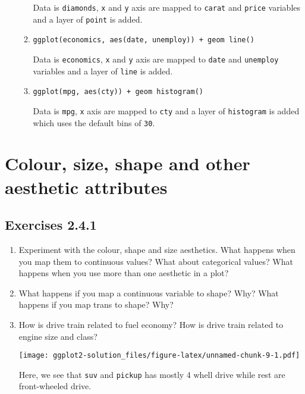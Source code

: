 \documentclass[]{book}
\newenvironment{Shaded}{\begin{snugshade}}{\end{snugshade}}
\newcommand{\KeywordTok}[1]{\textcolor[rgb]{0.13,0.29,0.53}{\textbf{#1}}}
\newcommand{\DataTypeTok}[1]{\textcolor[rgb]{0.13,0.29,0.53}{#1}}
\newcommand{\StringTok}[1]{\textcolor[rgb]{0.31,0.60,0.02}{#1}}
\newcommand{\OperatorTok}[1]{\textcolor[rgb]{0.81,0.36,0.00}{\textbf{#1}}}
\newcommand{\NormalTok}[1]{#1}
\begin{document}
\begin{enumerate}
\begin{enumerate}
    Data is \texttt{diamonds}, \texttt{x} and \texttt{y} axis are mapped
    to \texttt{carat} and \texttt{price} variables and a layer of
    \texttt{point} is added.
  \item
    \texttt{ggplot(economics,\ aes(date,\ unemploy))\ +\ geom\ line()}

    Data is \texttt{economics}, \texttt{x} and \texttt{y} axis are
    mapped to \texttt{date} and \texttt{unemploy} variables and a layer
    of \texttt{line} is added.
  \item
    \texttt{ggplot(mpg,\ aes(cty))\ +\ geom\ histogram()}

    Data is \texttt{mpg}, \texttt{x} axis are mapped to \texttt{cty} and
    a layer of \texttt{histogram} is added which uses the default bins
    of \texttt{30}.
  \end{enumerate}
\end{enumerate}

\section{Colour, size, shape and other aesthetic
attributes}\label{colour-size-shape-and-other-aesthetic-attributes}

\subsection{Exercises 2.4.1}\label{exercises-2.4.1}

\begin{enumerate}
\def\labelenumi{\arabic{enumi}.}
\item
  Experiment with the colour, shape and size aesthetics. What happens
  when you map them to continuous values? What about categorical values?
  What happens when you use more than one aesthetic in a plot?
\item
  What happens if you map a continuous variable to shape? Why? What
  happens if you map trans to shape? Why?
\item
  How is drive train related to fuel economy? How is drive train related
  to engine size and class?

\begin{Shaded}
\end{Shaded}

  \texttt{[image: ggplot2-solution\_files/figure-latex/unnamed-chunk-9-1.pdf]}

  Here, we see that \texttt{suv} and \texttt{pickup} has mostly 4 whell
  drive while rest are front-wheeled drive.
\end{enumerate}
\end{document}
